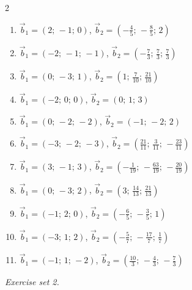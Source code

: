 \begin{multicols}{2}
\begin{enumerate}[label=\arabic*., leftmargin=*, itemsep=1pt]
\item $\vec b_1=(2;\,-1;\,0)$, $\vec b_2=(-\frac{4}{5};\,-\frac{8}{5};\,2)$
\item $\vec b_1=(-2;\,-1;\,-1)$, $\vec b_2=(-\frac{7}{3};\,\frac{7}{3};\,\frac{7}{3})$
\item $\vec b_1=(0;\,-3;\,1)$, $\vec b_2=(1;\,\frac{7}{10};\,\frac{21}{10})$
\item $\vec b_1=(-2;\,0;\,0)$, $\vec b_2=(0;\,1;\,3)$
\item $\vec b_1=(0;\,-2;\,-2)$, $\vec b_2=(-1;\,-2;\,2)$
\item $\vec b_1=(-3;\,-2;\,-3)$, $\vec b_2=(\frac{21}{11};\,\frac{3}{11};\,-\frac{23}{11})$
\item $\vec b_1=(3;\,-1;\,3)$, $\vec b_2=(-\frac{1}{19};\,-\frac{63}{19};\,-\frac{20}{19})$
\item $\vec b_1=(0;\,-3;\,2)$, $\vec b_2=(3;\,\frac{14}{13};\,\frac{21}{13})$
\item $\vec b_1=(-1;\,2;\,0)$, $\vec b_2=(-\frac{6}{5};\,-\frac{3}{5};\,1)$
\item $\vec b_1=(-3;\,1;\,2)$, $\vec b_2=(-\frac{5}{7};\,-\frac{17}{7};\,\frac{1}{7})$
\item $\vec b_1=(-1;\,1;\,-2)$, $\vec b_2=(\frac{10}{3};\,-\frac{4}{3};\,-\frac{7}{3})$
\end{enumerate}
\end{multicols}
\par\noindent\emph{Exercise set 2.}\nopagebreak
